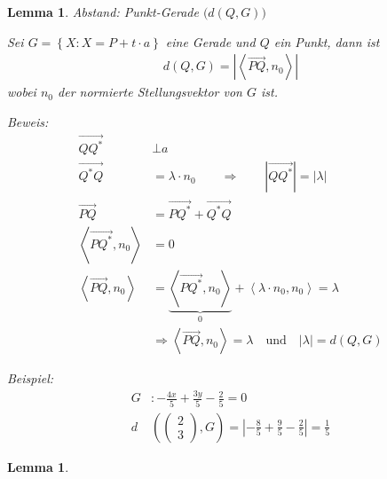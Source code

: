 \documentclass[%
a4paper,
10pt,           %
]
{scrartcl}
\newcommand{\ora}{\overrightarrow}
\theoremstyle{plain}
\theoremstyle{plain}
\theoremstyle{plain}
\newtheorem{mylemma}[mydef]{Lemma}
\theoremstyle{plain}
\theoremstyle{plain}
\begin{document}
\begin{mylemma}
    Abstand: Punkt-Gerade $\big( d(Q,G) \big)$\\

    \begin{minipage}{0.6\textwidth}
        Sei $G = \left\{ X : X = P+t \cdot a \right\}$ eine Gerade und $Q$ ein Punkt, dann ist
        \begin{align*}
            d(Q,G) = \left| \left\langle \ora{PQ} , n_0 \right\rangle \right|
        \end{align*}
        wobei $n_0$ der normierte Stellungsvektor von $G$ ist.
    \end{minipage}
    \begin{minipage}{0.4\textwidth}
        \begin{center}
        \end{center}
    \end{minipage}

    \textit{Beweis:}
    \begin{align*}
        \ora{QQ^*} & \bot a\\
        \ora{Q^*Q} & = \lambda \cdot n_0 \qquad \Rightarrow \qquad \left| \ora{QQ^*} \right| = \left| \lambda \right|\\
        \ora{PQ} & = \ora{PQ^*}  + \ora{Q^*Q}\\
        \left\langle \ora{PQ^*} , n_0 \right\rangle & = 0\\
        \left\langle \ora{PQ} , n_0 \right\rangle & = \underbrace{\left\langle \ora{PQ^*} , n_0 \right\rangle}_{0} + \left\langle \lambda \cdot n_0, n_0 \right\rangle = \lambda\\
        & \Rightarrow \left\langle \ora{PQ} , n_0 \right\rangle = \lambda \quad \text{und} \quad |\lambda| = d(Q,G)
    \end{align*}
\end{mylemma}
\textit{Beispiel:}
\begin{align*}
    G & : -\frac{4x}{5} + \frac{3y}{5} - \frac{2}{5} = 0\\
    d & \left(
    \begin{pmatrix}
        2\\3
    \end{pmatrix}
    ,G
    \right)
    =
    \left| -\frac{8}{5} + \frac{9}{5} - \frac{2}{5}  \right| = \frac{1}{5}
\end{align*}

\begin{mylemma}

\end{mylemma}

\end{document}
